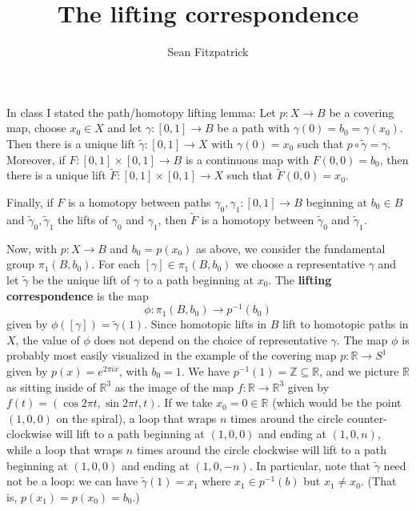 \documentclass[letterpaper,12pt]{article}
\title{The lifting correspondence}
\author{Sean Fitzpatrick}
\newcommand{\R}{\mathbb{R}}
\newcommand{\Z}{\mathbb{Z}}
\begin{document}
\maketitle

In class I stated the path/homotopy lifting lemma: Let $p:X\to B$ be a covering map, choose $x_0\in X$ and let $\gamma:[0,1]\to B$ be a path with $\gamma(0)=b_0=\gamma(x_0)$. Then there is a unique lift $\tilde{\gamma}:[0,1]\to X$ with $\gamma(0)=x_0$ such that $p\circ\tilde{\gamma}=\gamma$. Moreover, if $F:[0,1]\times[0,1]\to B$ is a continuous map with $F(0,0)=b_0$, then there is a unique lift $\tilde{F}:[0,1]\times [0,1]\to X$ such that $\tilde{F}(0,0)=x_0$.

Finally, if $F$ is a homotopy between paths $\gamma_0,\gamma_1:[0,1]\to B$ beginning at $b_0\in B$ and $\tilde{\gamma}_0,\tilde{\gamma}_1$ the lifts of $\gamma_0$ and $\gamma_1$, then $\tilde{F}$ is a homotopy between $\tilde{\gamma}_0$ and $\tilde{\gamma}_1$.

Now, with $p:X\to B$ and $b_0=p(x_0)$ as above, we consider the fundamental group $\pi_1(B,b_0)$. For each $[\gamma]\in\pi_1(B,b_0)$ we choose a representative $\gamma$ and let $\tilde{\gamma}$ be the unique lift of $\gamma$ to a path beginning at $x_0$. The {\bf lifting correspondence} is the map
\[
 \phi:\pi_1(B,b_0)\to p^{-1}(b_0)
\]
given by $\phi([\gamma]) = \tilde{\gamma}(1)$. Since homotopic lifts in $B$ lift to homotopic paths in $X$, the value of $\phi$ does not depend on the choice of representative $\gamma$. The map $\phi$ is probably most easily visualized in the example of the covering map $p:\R\to S^1$ given by $p(x) = e^{2\pi i x}$, with $b_0=1$. We have $p^{-1}(1)=\Z\subseteq \R$, and we picture $\R$ as sitting inside of $\R^3$ as the image of the map $f:\R\to\R^3$ given by $f(t) = (\cos 2\pi t, \sin 2\pi t, t)$. If we take $x_0=0\in \R$ (which would be the point $(1,0,0)$ on the spiral), a loop that wraps $n$ times around the circle counter-clockwise will lift to a path beginning at $(1,0,0)$ and ending at $(1,0,n)$, while a loop that wraps $n$ times around the circle clockwise will lift to a path beginning at $(1,0,0)$ and ending at $(1,0,-n)$. In particular, note that $\tilde{\gamma}$ need not be a loop: we can have $\tilde{\gamma}(1)=x_1$ where $x_1\in p^{-1}(b)$ but $x_1\neq x_0$. (That is, $p(x_1)=p(x_0)=b_0$.)
\end{document}

